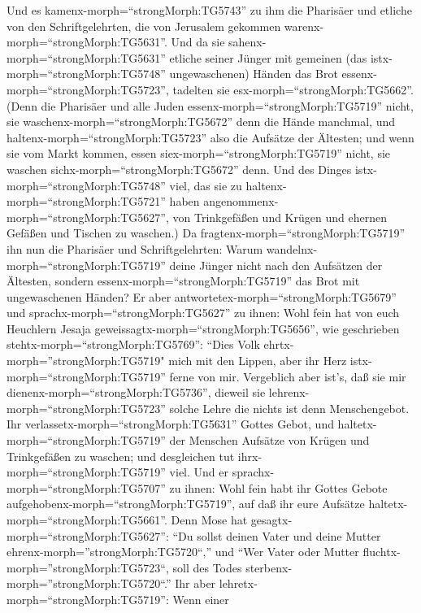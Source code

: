  Und es kamenx-morph=``strongMorph:TG5743'' zu ihm die
Pharisäer und etliche von den Schriftgelehrten, die von Jerusalem
gekommen warenx-morph=``strongMorph:TG5631''.  Und da sie
sahenx-morph=``strongMorph:TG5631'' etliche seiner Jünger mit gemeinen
(das istx-morph=``strongMorph:TG5748'' ungewaschenen) Händen das Brot
essenx-morph=``strongMorph:TG5723'', tadelten sie
esx-morph=``strongMorph:TG5662''.  (Denn die Pharisäer und
alle Juden essenx-morph=``strongMorph:TG5719'' nicht, sie
waschenx-morph=``strongMorph:TG5672'' denn die Hände manchmal, und
haltenx-morph=``strongMorph:TG5723'' also die Aufsätze der Ältesten;
 und wenn sie vom Markt kommen, essen
siex-morph=``strongMorph:TG5719'' nicht, sie waschen
sichx-morph=``strongMorph:TG5672'' denn. Und des Dinges
istx-morph=``strongMorph:TG5748'' viel, das sie zu
haltenx-morph=``strongMorph:TG5721'' haben
angenommenx-morph=``strongMorph:TG5627'', von Trinkgefäßen und Krügen
und ehernen Gefäßen und Tischen zu waschen.)  Da
fragtenx-morph=``strongMorph:TG5719'' ihn nun die Pharisäer und
Schriftgelehrten: Warum wandelnx-morph=``strongMorph:TG5719'' deine
Jünger nicht nach den Aufsätzen der Ältesten, sondern
essenx-morph=``strongMorph:TG5719'' das Brot mit ungewaschenen Händen?
 Er aber antwortetex-morph=``strongMorph:TG5679'' und
sprachx-morph=``strongMorph:TG5627'' zu ihnen: Wohl fein hat von euch
Heuchlern Jesaja geweissagtx-morph=``strongMorph:TG5656'', wie
geschrieben stehtx-morph=``strongMorph:TG5769'': ``Dies Volk
ehrtx-morph=''strongMorph:TG5719" mich mit den Lippen, aber ihr Herz
istx-morph=``strongMorph:TG5719'' ferne von mir.  Vergeblich
aber ist's, daß sie mir dienenx-morph=``strongMorph:TG5736'', dieweil
sie lehrenx-morph=``strongMorph:TG5723'' solche Lehre die nichts ist
denn Menschengebot.  Ihr
verlassetx-morph=``strongMorph:TG5631'' Gottes Gebot, und
haltetx-morph=``strongMorph:TG5719'' der Menschen Aufsätze von Krügen
und Trinkgefäßen zu waschen; und desgleichen tut
ihrx-morph=``strongMorph:TG5719'' viel.  Und er
sprachx-morph=``strongMorph:TG5707'' zu ihnen: Wohl fein habt ihr Gottes
Gebote aufgehobenx-morph=``strongMorph:TG5719'', auf daß ihr eure
Aufsätze haltetx-morph=``strongMorph:TG5661''.  Denn Mose
hat gesagtx-morph=``strongMorph:TG5627'': ``Du sollst deinen Vater und
deine Mutter ehrenx-morph=''strongMorph:TG5720``,'' und ``Wer Vater oder
Mutter fluchtx-morph=''strongMorph:TG5723``, soll des Todes
sterbenx-morph=''strongMorph:TG5720``.''  Ihr aber
lehretx-morph=``strongMorph:TG5719'': Wenn einer
